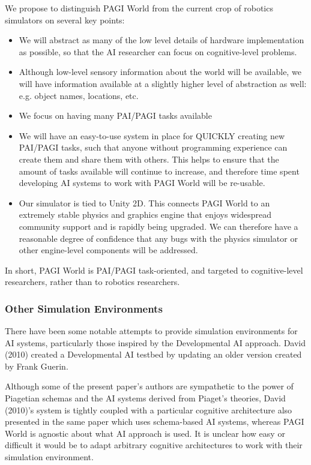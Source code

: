 We propose to distinguish PAGI World from the current crop of robotics simulators on several key points:
\begin{itemize}
\item We will abstract as many of the low level details of hardware implementation as possible, so that the AI researcher can focus on cognitive-level problems.
\item Although low-level sensory information about the world will be available, we will have information available at a slightly higher level of abstraction as well: e.g. object names, locations, etc.
\item We focus on having many PAI/PAGI tasks available
\item We will have an easy-to-use system in place for QUICKLY creating new PAI/PAGI tasks, such that anyone without programming experience can create them and share them with others. This helps to ensure that the amount of tasks available will continue to increase, and therefore time spent developing AI systems to work with PAGI World will be re-usable.
\item Our simulator is tied to Unity 2D. This connects PAGI World to an extremely stable physics and graphics engine that enjoys widespread community support and is rapidly being upgraded. We can therefore have a reasonable degree of confidence that any bugs with the physics simulator or other engine-level components will be addressed.
\end{itemize}

In short, PAGI World is PAI/PAGI task-oriented, and targeted to cognitive-level researchers, rather than to robotics researchers.

\subsubsection{Other Simulation Environments}

There have been some notable attempts to provide simulation environments for AI systems, particularly those inspired by the Developmental AI approach. David (2010) \nocite{David2010} created a Developmental AI testbed by updating an older version created by Frank Guerin.

Although some of the present paper's authors are sympathetic to the power of Piagetian schemas and the AI systems derived from Piaget's theories, David (2010)'s system is tightly coupled with a particular cognitive architecture also presented in the same paper which uses schema-based AI systems, whereas PAGI World is agnostic about what AI approach is used. It is unclear how easy or difficult it would be to adapt arbitrary cognitive architectures to work with their simulation environment.

